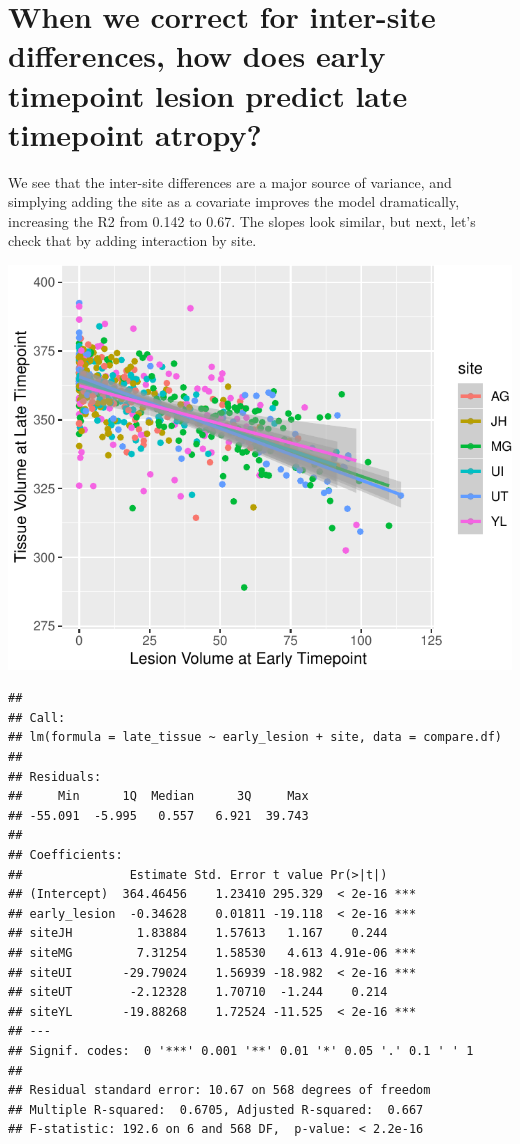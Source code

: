 \documentclass[
]{article}
\begin{document}
\hypertarget{when-we-correct-for-inter-site-differences-how-does-early-timepoint-lesion-predict-late-timepoint-atropy}{%
\section{When we correct for inter-site differences, how does early
timepoint lesion predict late timepoint
atropy?}\label{when-we-correct-for-inter-site-differences-how-does-early-timepoint-lesion-predict-late-timepoint-atropy}}

We see that the inter-site differences are a major source of variance,
and simplying adding the site as a covariate improves the model
dramatically, increasing the R2 from 0.142 to 0.67. The slopes look
similar, but next, let's check that by adding interaction by site.

\begin{center}\includegraphics{paper_files/figure-latex/plot_harm-1} \end{center}

\begin{verbatim}
## 
## Call:
## lm(formula = late_tissue ~ early_lesion + site, data = compare.df)
## 
## Residuals:
##     Min      1Q  Median      3Q     Max 
## -55.091  -5.995   0.557   6.921  39.743 
## 
## Coefficients:
##               Estimate Std. Error t value Pr(>|t|)    
## (Intercept)  364.46456    1.23410 295.329  < 2e-16 ***
## early_lesion  -0.34628    0.01811 -19.118  < 2e-16 ***
## siteJH         1.83884    1.57613   1.167    0.244    
## siteMG         7.31254    1.58530   4.613 4.91e-06 ***
## siteUI       -29.79024    1.56939 -18.982  < 2e-16 ***
## siteUT        -2.12328    1.70710  -1.244    0.214    
## siteYL       -19.88268    1.72524 -11.525  < 2e-16 ***
## ---
## Signif. codes:  0 '***' 0.001 '**' 0.01 '*' 0.05 '.' 0.1 ' ' 1
## 
## Residual standard error: 10.67 on 568 degrees of freedom
## Multiple R-squared:  0.6705, Adjusted R-squared:  0.667 
## F-statistic: 192.6 on 6 and 568 DF,  p-value: < 2.2e-16
\end{verbatim}
\end{document}
